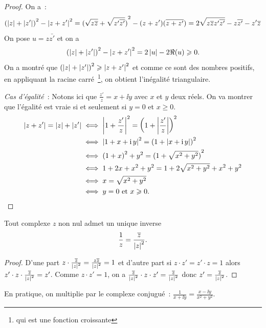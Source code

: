 \begin{proof}
  On a~:
  \begin{equation*}
    {(\left\lvert z\right\rvert + \left\lvert z'\right\rvert)}^2-\left\lvert z + z'\right\rvert^2 = {(\sqrt{z \overline{z}} +
    \sqrt{z'\overline{z'}})}^2 - (z + z')(\overline{z + z'}) = 2 \sqrt{z \overline{z} z'
    \overline{z'}} - z \overline{z'} - z'\overline{z}
  \end{equation*}
  On pose \(u = z \bar{z'}\) et on a \[{(\left\lvert z\right\rvert + \left\lvert z'\right\rvert)}^2-\left\lvert z + z'\right\rvert^2 =
  2 \left\lvert u\right\rvert-2 \Re(u) \geqslant 0.\]
  On a montré que \({(\left\lvert z\right\rvert + \left\lvert z'\right\rvert)}^2 \geqslant \left\lvert z + z'\right\rvert^2\) et comme
  ce sont des nombres positifs, en appliquant la racine carré~\footnote{qui
  est une fonction croissante}, on obtient l'inégalité triangulaire.

  \emph{Cas d'égalité}~: Notons ici que \(\frac{z'}{z} = x + \ii{}y\) avec
  \(x\) et \(y\) deux réels. On va montrer que l'égalité est vraie si et
  seulement si \(y = 0\) et \(x \geqslant 0\).
  \begin{align}
    \left\lvert z + z'\right\rvert = \left\lvert z\right\rvert + \left\lvert z'\right\rvert &\iff \left\lvert1 + \frac{z'}{z}\right\rvert^2 =
    {\left(1 + \left\lvert\frac{z'}{z}\right\rvert\right)}^2 \\
    &\iff \left\lvert1 + x + \operatorname{i}{}y\right\rvert^2 = {(1+\left\lvert x+ \operatorname{i}{}y\right\rvert)}^2 \\
    &\iff {(1 + x)}^2 + y^2 = {(1 + \sqrt{x^2 + y^2})}^2 \\
    &\iff 1 + 2x + x^2 + y^2 = 1 + 2\sqrt{x^2 + y^2} + x^2 + y^2 \\
    &\iff x = \sqrt{x^2 + y^2}\\
    &\iff y = 0 \text{~et~} x \geqslant 0.
  \end{align}
\end{proof}

\begin{prop}
  Tout complexe \(z\) non nul admet un unique inverse
  \begin{equation}
    \frac{1}{z} = \frac{\overline{z}}{\left\lvert z\right\rvert^2}.
  \end{equation}
\end{prop}

\begin{proof}
  D'une part \(z \cdot \frac{\overline{z}}{\left\lvert z\right\rvert^2} = \frac{z \overline{z}}{\left\lvert z\right\rvert^2}
  = 1\) et d'autre part si \(z\cdot z' = z'\cdot z = 1\) alors \(z'\cdot
  z\cdot \frac{\overline{z}}{\left\lvert z\right\rvert^2} = z'\). Comme \(z\cdot z' = 1\), on a \(
  \frac{\overline{z}}{\left\lvert z\right\rvert^2}\cdot z\cdot z' = \frac{\overline{z}}{\left\lvert z\right\rvert^2}\) donc
  \(z' = \frac{\overline{z}}{\left\lvert z\right\rvert^2}\).
\end{proof}

En pratique, on multiplie par le complexe conjugué~: \(\frac{1}{x + \ii{}y} =
\frac{x -\ii{}y}{x^2 + y^2}\).

